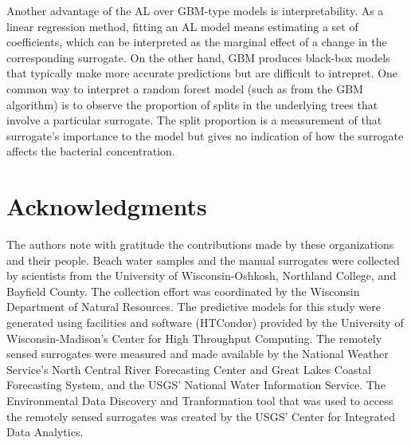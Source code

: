 \documentclass[authoryear,review, 12pt]{elsarticle}
\begin{document}
Another advantage of the AL over GBM-type models is interpretability. As
a linear regression method, fitting an AL model means estimating a
set of coefficients, which can be interpreted as the marginal effect of
a change in the corresponding surrogate. On the other hand, GBM produces
black-box models that typically make more accurate predictions but are
difficult to intrepret. One common way to interpret a random forest
model (such as from the GBM algorithm) is to observe the proportion of
splits in the underlying trees that involve a particular surrogate. The
split proportion is a measurement of that surrogate's importance to the
model but gives no indication of how the surrogate affects the
bacterial concentration.


\section{Acknowledgments}\label{acknowledgments}

The authors note with gratitude the contributions made by these organizations and their people. Beach water samples and the manual surrogates were collected by scientists from the University of Wisconsin-Oshkosh, Northland College, and Bayfield County. The collection effort was coordinated by the Wisconsin Department of Natural Resources. The predictive models for this study were generated using facilities and
software (HTCondor) provided by the University of Wisconsin-Madison's
Center for High Throughput Computing. The remotely sensed surrogates were measured and made available by the National Weather Service's North Central River Forecasting Center and Great Lakes Coastal Forecasting System, and the USGS' National Water Information Service. The Environmental Data Discovery and Tranformation tool that was used to access the remotely sensed surrogates was created by the USGS' Center for Integrated Data Analytics.
\end{document}
